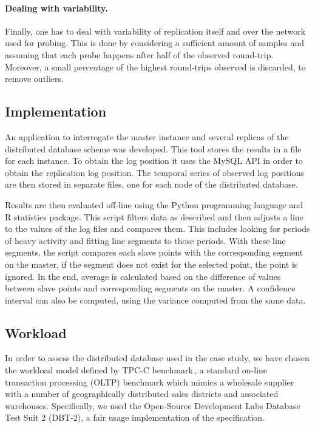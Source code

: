 \paragraph{Dealing with variability.} Finally, one has to deal with variability of replication itself and over the network used for probing. This is done by considering a sufficient amount of samples and assuming that each probe happens after half of the observed round-trip. Moreover, a small percentage of the highest round-trips observed is discarded, to remove outliers.

\subsection{Implementation}

An application to interrogate the master instance and several replicas of the distributed database scheme was developed. This tool stores the results in a file for each instance.
To obtain the log position it uses the MySQL API in order to obtain the replication log position. The temporal series of observed log positions are then stored in separate files, one for each node of the distributed database.

Results are then evaluated off-line using the Python programming language and R statistics package. This script filters data as described and then adjusts a line to the values of the log files and compares them. This includes looking for periods of heavy activity and fitting line segments to those periods. With these line segments, the script compares each slave points with the corresponding segment on the master, if the segment does not exist for the selected point, the point is ignored. In the end, average is calculated based on the difference of values between slave points and corresponding segments on the master. A confidence interval can also be computed, using the variance computed from the same data.


\subsection{Workload}

In order to assess the distributed database used in the case study, we have chosen the workload model defined by TPC-C benchmark\,\cite{Cou01}, a standard on-line transaction processing (OLTP) benchmark which mimics a wholesale supplier with a number of geographically distributed sales districts and associated warehouses. Specifically, we used the Open-Source Development Labs Database Test Suit 2 (DBT-2), a fair usage implementation of the specification.

